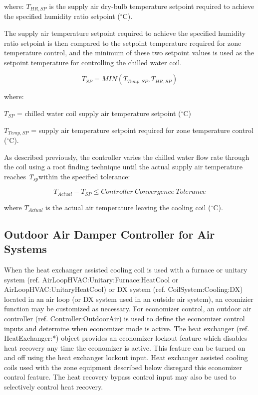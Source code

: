 where: \({T_{HR,SP}}\) is the supply air dry-bulb temperature setpoint required to achieve the specified humidity ratio setpoint (\(^{\circ}\)C).

The supply air temperature setpoint required to achieve the specified humidity ratio setpoint is then compared to the setpoint temperature required for zone temperature control, and the minimum of these two setpoint values is used as the setpoint temperature for controlling the chilled water coil.

\begin{equation}
{T_{SP}} = MIN\left( {{T_{Temp,SP}},{T_{HR,SP}}} \right)
\end{equation}

where:

\({T_{SP}}\) = chilled water coil supply air temperature setpoint (\(^{\circ}\)C)

\({T_{Temp,SP}}\) = supply air temperature setpoint required for zone temperature control (\(^{\circ}\)C).

As described previously, the controller varies the chilled water flow rate through the coil using a root finding technique until the actual supply air temperature reaches \emph{T\(_{sp}\)}within the specified tolerance:

\begin{equation}
{T_{Actual}} - {T_{SP}} \le Controller~Convergence~Tolerance
\end{equation}

where \({T_{Actual}}\) is the actual air temperature leaving the cooling coil (\(^{\circ}\)C).

\subsection{Outdoor Air Damper Controller for Air Systems}\label{outdoor-air-damper-controller-for-air-systems}

When the heat exchanger assisted cooling coil is used with a furnace or unitary system (ref. AirLoopHVAC:Unitary:Furnace:HeatCool or AirLoopHVAC:UnitaryHeatCool) or DX system (ref. CoilSystem:Cooling:DX) located in an air loop (or DX system used in an outside air system), an ecomizier function may be customized as necessary. For economizer control, an outdoor air controller (ref. Controller:OutdoorAir) is used to define the economizer control inputs and determine when economizer mode is active. The heat exchanger (ref. HeatExchanger:*) object provides an economizer lockout feature which disables heat recovery any time the economizer is active. This feature can be turned on and off using the heat exchanger lockout input. Heat exchanger assisted cooling coils used with the zone equipment described below disregard this economizer control feature. The heat recovery bypass control input may also be used to selectively control heat recovery.

